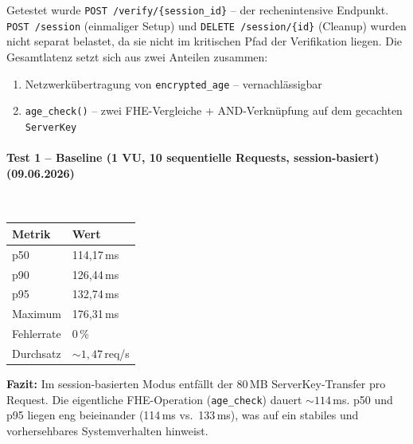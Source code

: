 Getestet wurde \texttt{POST /verify/\{session\_id\}} -- der rechenintensive Endpunkt. \texttt{POST /session} (einmaliger Setup) und \texttt{DELETE /session/\{id\}} (Cleanup) wurden nicht separat belastet, da sie nicht im kritischen Pfad der Verifikation liegen.
Die Gesamtlatenz setzt sich aus zwei Anteilen zusammen:
\begin{enumerate}
  \item Netzwerkübertragung von \texttt{encrypted\_age} -- vernachlässigbar
  \item \texttt{age\_check()} -- zwei FHE-Vergleiche + AND-Verknüpfung auf dem gecachten \texttt{ServerKey}
\end{enumerate}

\paragraph{Test 1 -- Baseline (1 VU, 10 sequentielle Requests, session-basiert) (09.06.2026)}

\mbox{}\\
\begin{table}[H]
\centering
\begin{tabular}{||l|l||}
    \hline
    \textbf{Metrik} & \textbf{Wert} \\
    \hline\hline
    p50 & 114{,}17\,ms \\
    \hline
    p90 & 126{,}44\,ms \\
    \hline
    p95 & 132{,}74\,ms \\
    \hline
    Maximum & 176{,}31\,ms \\
    \hline
    Fehlerrate & 0\,\% \\
    \hline
    Durchsatz & ${\sim}1{,}47$\,req/s \\
    \hline
\end{tabular}
\end{table}

\textbf{Fazit:} Im session-basierten Modus entfällt der 80\,MB ServerKey-Transfer pro Request.
Die eigentliche FHE-Operation (\texttt{age\_check}) dauert ${\sim}114$\,ms. p50 und p95 liegen eng beieinander (114\,ms vs.\ 133\,ms), was auf ein stabiles und vorhersehbares Systemverhalten hinweist.

